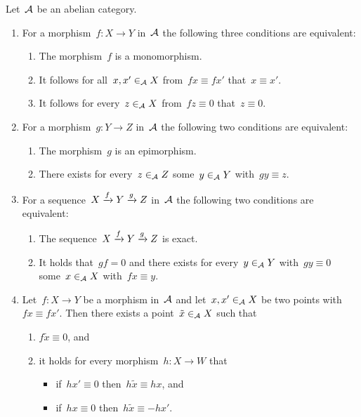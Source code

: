 \begin{theorem}
  \label{rules for diagram chase}
  Let~$\mathcal{A}$ be an abelian category.
  \begin{enumerate}
    \item
      \label{abstract injective}
      For a morphism~$f \colon X \to Y$ in~$\mathcal{A}$ the following three conditions are equivalent:
      \begin{enumerate}
        \item
          The morphism~$f$ is a monomorphism.
        \item
          It follows for all~$x, x' \in_{\mathcal{A}} X$ from~$fx \equiv fx'$ that~$x \equiv x'$.
        \item
          It follows for every~$z \in_{\mathcal{A}} X$ from~$fz \equiv 0$ that~$z \equiv 0$.
      \end{enumerate}
    \item
    \label{abstract surjective}
      For a morphism~$g \colon Y \to Z$ in~$\mathcal{A}$ the following two conditions are equivalent:
      \begin{enumerate}
        \item
          The morphism~$g$ is an epimorphism.
        \item
          There exists for every~$z \in_{\mathcal{A}} Z$ some~$y \in_{\mathcal{A}} Y$ with~$gy \equiv z$.
      \end{enumerate}
    \item
      For a sequence~$X \xrightarrow{f} Y \xrightarrow{g} Z$ in~$\mathcal{A}$ the following two conditions are equivalent:
      \begin{enumerate}
        \item
          The sequence~$X \xrightarrow{f} Y \xrightarrow{g} Z$ is exact.
        \item
          It holds that~$gf = 0$ and there exists for every~$y \in_{\mathcal{A}} Y$ with~$gy \equiv 0$ some~$x \in_{\mathcal{A}} X$ with~$fx \equiv y$.
      \end{enumerate}
    \item
      \label{difference element}
      Let~$f \colon X \to Y$ be a morphism in~$\mathcal{A}$ and let~$x, x' \in_{\mathcal{A}} X$ be two points with~$fx \equiv fx'$.
      Then there exists a point~$\tilde{x} \in_{\mathcal{A}} X$ such that
      \begin{enumerate}
        \item
          $f \tilde{x} \equiv 0$, and
        \item
          it holds for every morphism~$h \colon X \to W$ that
          \begin{itemize}
            \item
              if~$hx' \equiv 0$ then~$h \tilde{x} \equiv hx$, and
            \item
              if~$hx \equiv 0$ then~$h \tilde{x} \equiv -hx'$.
          \end{itemize}
      \end{enumerate}
  \end{enumerate}
\end{theorem}


